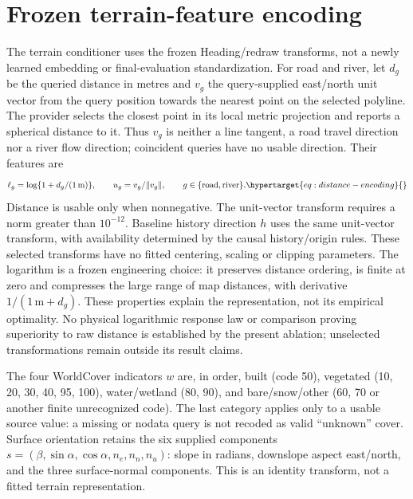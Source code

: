 \section{Frozen terrain-feature encoding}
\label{sec:feature-encoding}\hypertarget{sec:feature-encoding}{}
The terrain conditioner uses the frozen Heading/redraw transforms,
not a newly learned embedding or final-evaluation standardization. For road
and river, let \(d_g\) be the queried distance in metres and \(v_g\) the
query-supplied east/north unit vector from the query position towards the
nearest point on the selected polyline. The provider selects the closest
point in its local metric projection and reports a spherical distance to it.
Thus \(v_g\) is neither a line tangent, a road travel direction nor a river
flow direction; coincident queries have no usable direction. Their features are
\begin{equation}
 \ell_g=\log\{1+d_g/(1\,\mathrm{m})\},\qquad
 u_g=v_g/\|v_g\|,\qquad g\in\{\mathrm{road},\mathrm{river}\}.
 \label{eq:distance-encoding}\hypertarget{eq:distance-encoding}{}
\end{equation}
Distance is usable only when nonnegative. The unit-vector transform requires
a norm greater than \(10^{-12}\). Baseline history direction \(h\) uses the
same unit-vector transform, with availability determined by the causal
history/origin rules. These selected transforms have no fitted centering,
scaling or clipping parameters. The logarithm is a frozen engineering choice:
it preserves distance ordering, is finite at zero and compresses the large
range of map distances, with derivative \(1/(1\,\mathrm m+d_g)\).
These properties explain the representation, not its empirical optimality.
No physical logarithmic response law or comparison proving superiority to raw
distance is established by the present ablation; unselected transformations
remain outside its result claims.

The four WorldCover indicators \(w\) are, in order, built (code 50), vegetated
(10, 20, 30, 40, 95, 100), water/wetland (80, 90), and bare/snow/other (60, 70
or another finite unrecognized code). The last category applies only to a
usable source value: a missing or nodata query is not recoded as valid
``unknown'' cover. Surface orientation retains the six supplied components
\(s=(\beta,\sin\alpha,\cos\alpha,n_e,n_n,n_u)\): slope in radians, downslope
aspect east/north, and the three surface-normal components. This is an
identity transform, not a fitted terrain representation.

